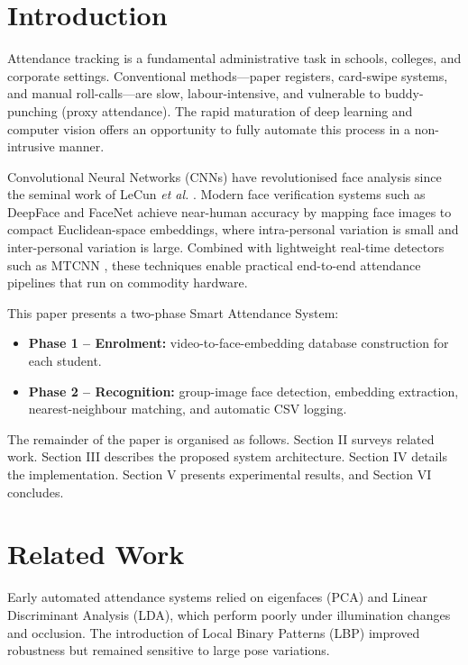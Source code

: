 \documentclass[conference]{IEEEtran}
\begin{document}
\section{Introduction}

Attendance tracking is a fundamental administrative task in schools,
colleges, and corporate settings. Conventional methods---paper registers,
card-swipe systems, and manual roll-calls---are slow, labour-intensive,
and vulnerable to buddy-punching (proxy attendance). The rapid maturation
of deep learning and computer vision offers an opportunity to fully
automate this process in a non-intrusive manner.

Convolutional Neural Networks (CNNs) have revolutionised face analysis
since the seminal work of LeCun \emph{et al.} \cite{b1}. Modern face
verification systems such as DeepFace \cite{b2} and FaceNet \cite{b3}
achieve near-human accuracy by mapping face images to compact
Euclidean-space embeddings, where intra-personal variation is small and
inter-personal variation is large. Combined with lightweight real-time
detectors such as MTCNN \cite{b4}, these techniques enable practical
end-to-end attendance pipelines that run on commodity hardware.

This paper presents a two-phase Smart Attendance System:
\begin{itemize}
    \item \textbf{Phase 1 -- Enrolment:} video-to-face-embedding
          database construction for each student.
    \item \textbf{Phase 2 -- Recognition:} group-image face detection,
          embedding extraction, nearest-neighbour matching, and
          automatic CSV logging.
\end{itemize}

The remainder of the paper is organised as follows. Section II surveys
related work. Section III describes the proposed system architecture.
Section IV details the implementation. Section V presents experimental
results, and Section VI concludes.

\section{Related Work}

Early automated attendance systems relied on eigenfaces \cite{b5} (PCA)
and Linear Discriminant Analysis (LDA), which perform poorly under
illumination changes and occlusion. The introduction of Local Binary
Patterns (LBP) \cite{b6} improved robustness but remained sensitive to
large pose variations.
\end{document}
